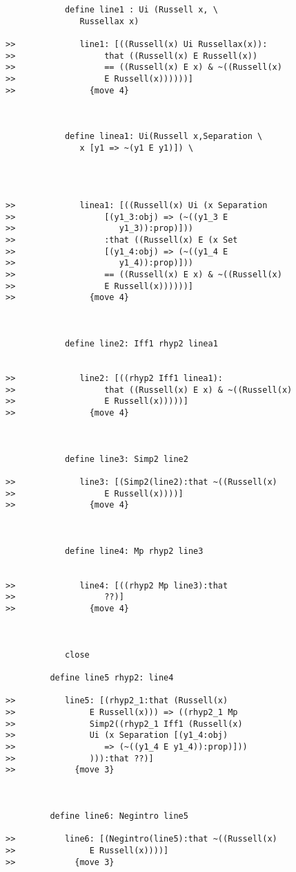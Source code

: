\documentclass[12pt]{article}
\begin{document}
\begin{verbatim}
            define line1 : Ui (Russell x, \
               Russellax x)

>>             line1: [((Russell(x) Ui Russellax(x)):
>>                  that ((Russell(x) E Russell(x))
>>                  == ((Russell(x) E x) & ~((Russell(x)
>>                  E Russell(x))))))]
>>               {move 4}



            define linea1: Ui(Russell x,Separation \
               x [y1 => ~(y1 E y1)]) \
               



>>             linea1: [((Russell(x) Ui (x Separation
>>                  [(y1_3:obj) => (~((y1_3 E
>>                     y1_3)):prop)]))
>>                  :that ((Russell(x) E (x Set
>>                  [(y1_4:obj) => (~((y1_4 E
>>                     y1_4)):prop)]))
>>                  == ((Russell(x) E x) & ~((Russell(x)
>>                  E Russell(x))))))]
>>               {move 4}



            define line2: Iff1 rhyp2 linea1


>>             line2: [((rhyp2 Iff1 linea1):
>>                  that ((Russell(x) E x) & ~((Russell(x)
>>                  E Russell(x)))))]
>>               {move 4}



            define line3: Simp2 line2

>>             line3: [(Simp2(line2):that ~((Russell(x)
>>                  E Russell(x))))]
>>               {move 4}



            define line4: Mp rhyp2 line3


>>             line4: [((rhyp2 Mp line3):that
>>                  ??)]
>>               {move 4}



            close

         define line5 rhyp2: line4

>>          line5: [(rhyp2_1:that (Russell(x)
>>               E Russell(x))) => ((rhyp2_1 Mp
>>               Simp2((rhyp2_1 Iff1 (Russell(x)
>>               Ui (x Separation [(y1_4:obj)
>>                  => (~((y1_4 E y1_4)):prop)]))
>>               ))):that ??)]
>>            {move 3}



         define line6: Negintro line5

>>          line6: [(Negintro(line5):that ~((Russell(x)
>>               E Russell(x))))]
>>            {move 3}




\end{verbatim}
\end{document}
